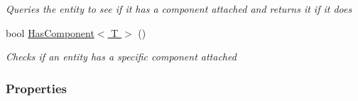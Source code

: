 \begin{DoxyCompactItemize}
\begin{DoxyCompactList}\small\item\em Queries the entity to see if it has a component attached and returns it if it does \end{DoxyCompactList}\item 
bool \hyperlink{class_m_b2_d_1_1_entity_component_1_1_entity_a8bbe196918b2eb4fe2102285c310ced3}{Has\+Component$<$ T $>$} ()
\begin{DoxyCompactList}\small\item\em Checks if an entity has a specific component attached \end{DoxyCompactList}\end{DoxyCompactItemize}
\subsubsection*{Properties}
